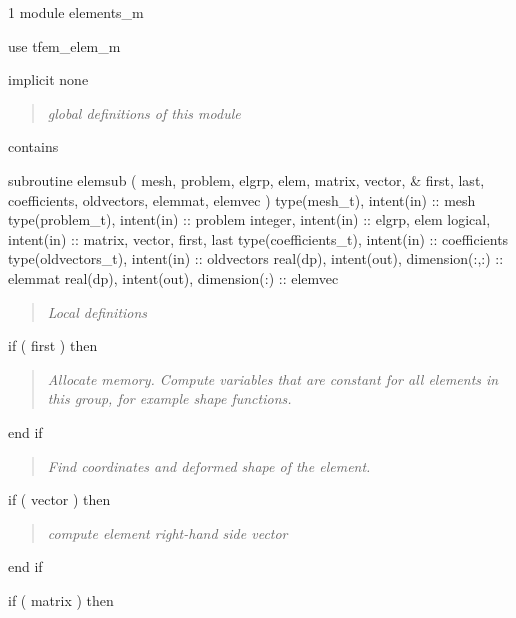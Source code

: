 \begin{listing}{1}
module elements_m

  use tfem_elem_m

  implicit none

\end{listing}
\begin{quote}
   \emph{global definitions of this module}
\end{quote}
\begin{listingcont}

contains

  subroutine elemsub ( mesh, problem, elgrp, elem, matrix, vector, &
    first, last, coefficients, oldvectors, elemmat, elemvec )
    type(mesh_t), intent(in) :: mesh
    type(problem_t), intent(in) :: problem
    integer, intent(in) :: elgrp, elem
    logical, intent(in) :: matrix, vector, first, last
    type(coefficients_t), intent(in) :: coefficients
    type(oldvectors_t), intent(in) :: oldvectors
    real(dp), intent(out), dimension(:,:) :: elemmat
    real(dp), intent(out), dimension(:) :: elemvec

\end{listingcont}
\begin{quote}
   \quad\emph{Local definitions}
\end{quote}
\begin{listingcont}

    if ( first ) then
   
\end{listingcont}
\begin{quote}
   \qquad\parbox{10cm}{\emph{Allocate memory. Compute variables that are 
     constant for all elements in this group, for example shape functions.}}
\end{quote}
\begin{listingcont}

    end if
   
\end{listingcont}
\begin{quote}
   \quad\emph{Find coordinates and deformed shape of the element.}
\end{quote}
\begin{listingcont}

    if ( vector ) then
   
\end{listingcont}
\begin{quote}
   \qquad\emph{compute element right-hand side vector}
\end{quote}
\begin{listingcont}

    end if
   
    if ( matrix ) then
   
\end{listingcont}
